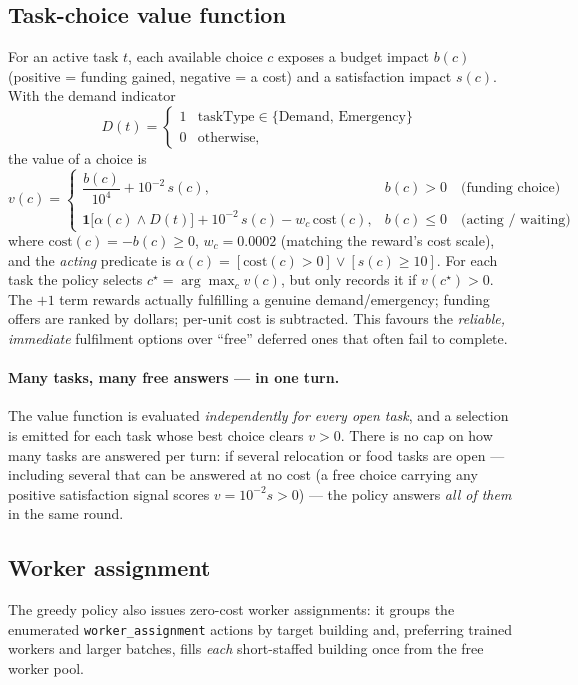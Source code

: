 \documentclass[11pt]{article}
\newcommand{\unity}[1]{{\color{unityblue}\texttt{\small #1}}}
\begin{document}
\subsection{Task-choice value function}
For an active task $t$, each available choice $c$ exposes a budget impact $b(c)$ (positive =
funding gained, negative = a cost) and a satisfaction impact $s(c)$. With the demand indicator
\[
D(t) = \begin{cases}1 & \text{taskType} \in \{\text{Demand},\,\text{Emergency}\}\\ 0 & \text{otherwise,}\end{cases}
\]
the value of a choice is
\begin{equation}
v(c) =
\begin{cases}
\dfrac{b(c)}{10^4} + 10^{-2}\,s(c), & b(c) > 0 \quad\text{(funding choice)}\\[10pt]
\mathbf{1}\!\big[\alpha(c)\wedge D(t)\big] + 10^{-2}\,s(c) - w_{c}\,\mathrm{cost}(c), & b(c) \le 0 \quad\text{(acting / waiting)}
\end{cases}
\label{eq:vfun}
\end{equation}
where $\mathrm{cost}(c) = -b(c) \ge 0$, $w_c = 0.0002$ (matching the reward's cost scale), and the
\emph{acting} predicate is $\alpha(c) = [\mathrm{cost}(c) > 0] \vee [s(c) \ge 10]$. For each task
the policy selects $c^\star = \arg\max_c v(c)$, but only records it if $v(c^\star) > 0$. The
$+1$ term rewards actually fulfilling a genuine demand/emergency; funding offers are ranked by
dollars; per-unit cost is subtracted. This favours the \emph{reliable, immediate} fulfilment
options over ``free'' deferred ones that often fail to complete.

\paragraph{Many tasks, many free answers --- in one turn.} The value function is evaluated
\emph{independently for every open task}, and a selection is emitted for each task whose best choice
clears $v>0$. There is no cap on how many tasks are answered per turn: if several relocation or food
tasks are open --- including several that can be answered at no cost (a free choice carrying any
positive satisfaction signal scores $v = 10^{-2}s > 0$) --- the policy answers \emph{all of them}
in the same round.

\subsection{Worker assignment}
The greedy policy also issues zero-cost worker assignments: it groups the enumerated
\unity{worker\_assignment} actions by target building and, preferring trained workers and larger
batches, fills \emph{each} short-staffed building once from the free worker pool.
\end{document}
